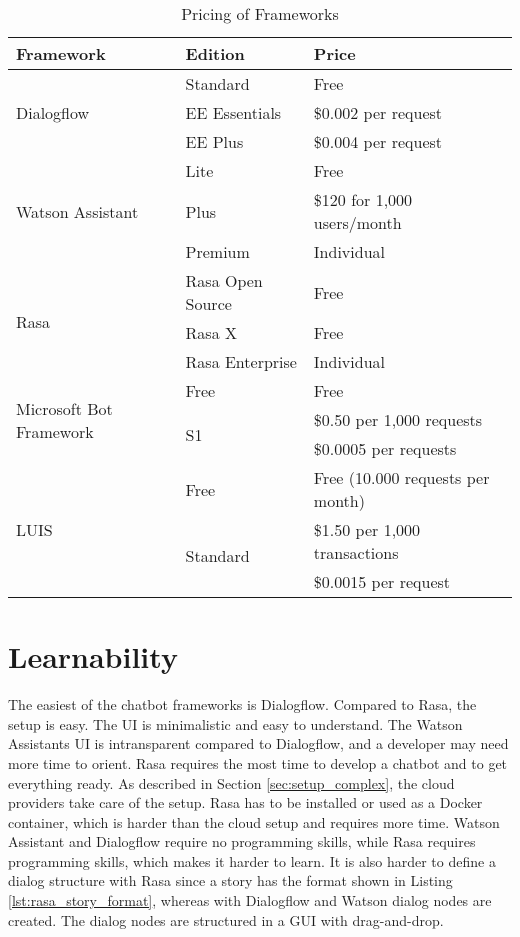 \begin{table}[H]
    \centering
    \begin{tabular}{ l | l | l }
        Framework & Edition & Price \\ \hline \hline
        \multirow{3}{*}{Dialogflow} & Standard & Free \\
        & EE Essentials &  \$0.002 per request\\
        & EE Plus & \$0.004 per request \\ \hline

        \multirow{3}{*}{Watson Assistant} & Lite & Free \\
        & Plus &  \$120 for 1,000 users/month\\
        & Premium & Individual \\ \hline

        \multirow{3}{*}{Rasa} & Rasa Open Source & Free \\
        & Rasa X &  Free\\
        & Rasa Enterprise & Individual \\ \hline

        
        \multirow{3}{*}{Microsoft Bot Framework} & Free  & Free \\
        & \multirow{2}{*}{S1} & \$0.50 per 1,000 requests \\ 
        & & \$0.0005 per requests \\ \hline
                
        \multirow{3}{*}{LUIS} & Free  & Free (10.000 requests per month) \\
        & \multirow{2}{*}{Standard} &  \$1.50 per 1,000 transactions\\
        & &  \$0.0015 per request
    \end{tabular}
    \caption{Pricing of Frameworks \cite{rasa, dialogflow, watsonassistant,luisdocs}} \label{tab:pricing}
\end{table} \noindent


\section*{Learnability}
The easiest of the chatbot frameworks is Dialogflow.
Compared to Rasa, the setup is easy.
The UI is minimalistic and easy to understand.
The Watson Assistants UI is intransparent compared to Dialogflow, and a developer may need more time to orient.
Rasa requires the most time to develop a chatbot and to get everything ready.
As described in Section \ref{sec:setup_complex}, the cloud providers take care of the setup.
Rasa has to be installed or used as a Docker container, which is harder than the cloud setup and requires more time.
Watson Assistant and Dialogflow require no programming skills, while Rasa requires programming skills, which makes it harder to learn.
It is also harder to define a dialog structure with Rasa since a story has the format shown in Listing \ref{lst:rasa_story_format}, whereas with Dialogflow and Watson dialog nodes are created.
The dialog nodes are structured in a GUI with drag-and-drop.


